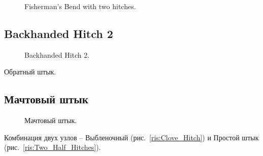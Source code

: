 \begin{figure}[H]\centering
	\begin{minipage}{1\linewidth}
		\begin{center}
			\tcbox[enhanced jigsaw,colframe=black,opacityframe=0.5,opacityback=0.5]
			{\centering{}}
		\end{center}
	\end{minipage}
\caption{Fisherman’s Bend with two hitches.}
\label{ris:Fishermans_Bend_with_two_hitches}
\end{figure}

\subsection{Backhanded Hitch 2}


\begin{figure}[H]\centering
	\begin{minipage}{1\linewidth}
		\begin{center}
			\tcbox[enhanced jigsaw,colframe=black,opacityframe=0.5,opacityback=0.5]
			{\centering{}}
		\end{center}
	\end{minipage}
\caption{Backhanded Hitch 2.}
\label{ris:Backhanded_Hitch_2}
\end{figure}

Обратный штык.

\subsection{Мачтовый штык}

\begin{figure}[H]\centering
	\begin{minipage}{1\linewidth}
		\begin{center}
			\tcbox[enhanced jigsaw,colframe=black,opacityframe=0.5,opacityback=0.5]
			{\centering{}}
		\end{center}
	\end{minipage}
\caption{Мачтовый штык.}
\label{ris:Machtovy}
\end{figure}

Комбинация двух узлов – Выбленочный (рис.~\ref{ris:Clove_Hitch}) и Простой штык (рис.~\ref{ris:Two_Half_Hitches}).


